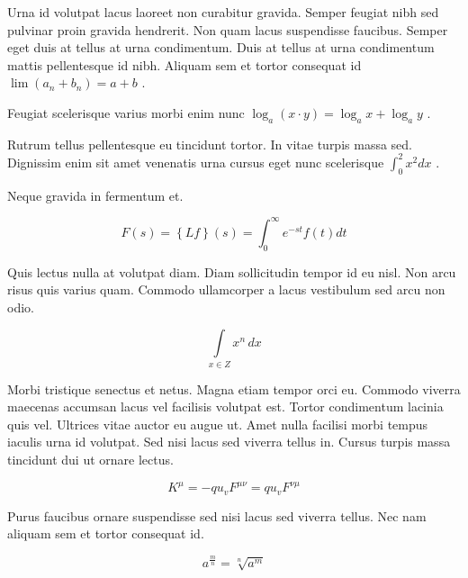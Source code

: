 \documentclass{article}
\begin{document}
	
    Urna id volutpat lacus laoreet non curabitur gravida. Semper feugiat nibh sed pulvinar proin gravida hendrerit. Non quam lacus suspendisse faucibus. Semper eget duis at tellus at urna condimentum. Duis at tellus at urna condimentum mattis pellentesque id nibh. Aliquam sem et tortor consequat id 
    \begin{math}
    \lim\left ( a_n+b_n \right )=a+b
    \end{math}
    .
    \newline
    
    Feugiat scelerisque varius morbi enim nunc 
    $ \log _{a}(x\cdot y)=\log _{a}x+\log _{a}y $
    .
    \newline
    
    Rutrum tellus pellentesque eu tincidunt tortor. In vitae turpis massa sed. Dignissim enim sit amet venenatis urna cursus eget nunc scelerisque 
    \( \int_0^2x^2dx \)
    .
    \newline
    
    Neque gravida in fermentum et. 
    
    \[ F\left ( s \right )=\left \{ Lf \right \}\left ( s \right )= \int_{0}^{\infty } e^{-st}f\left ( t \right ) dt  \]
    
    Quis lectus nulla at volutpat diam. Diam sollicitudin tempor id eu nisl. Non arcu risus quis varius quam. Commodo ullamcorper a lacus vestibulum sed arcu non odio.
    
    $$ \int\limits_{x\in Z}\! x^{n}\, dx $$
    
    Morbi tristique senectus et netus. Magna etiam tempor orci eu. Commodo viverra maecenas accumsan lacus vel facilisis volutpat est. Tortor condimentum lacinia quis vel. Ultrices vitae auctor eu augue ut. Amet nulla facilisi morbi tempus iaculis urna id volutpat. Sed nisi lacus sed viverra tellus in. Cursus turpis massa tincidunt dui ut ornare lectus.
    
    \begin{displaymath}
    	K^\mu =-qu_vF^{\mu \nu }=qu_vF^{\nu \mu }
    \end{displaymath}
    
    Purus faucibus ornare suspendisse sed nisi lacus sed viverra tellus. Nec nam aliquam sem et tortor consequat id.
    
    \begin{equation}
    a^{\frac{m}{n}}=\sqrt[n]{a^{m}}
    \end{equation}
    
\end{document}
